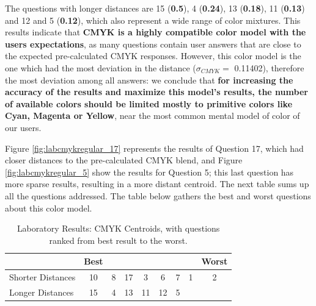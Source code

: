 %
The questions with longer distances are 15 (\textbf{0.5}), 4 (\textbf{0.24}), 13 (\textbf{0.18}), 11 (\textbf{0.13}) and 12 and 5 (\textbf{0.12}), which also represent a wide range of color mixtures. This results indicate that \textbf{CMYK is a highly compatible color model with the users expectations},
as many questions contain user answers that are close to the expected pre-calculated CMYK responses. However, this color model is the one which had the most deviation in the distance ($\sigma_{CMYK} = $ 0.11402), therefore the most deviation among all answers: we conclude that \textbf{for increasing the
accuracy of the results and maximize this model's results, the number of available colors should be limited mostly to primitive colors like Cyan, Magenta or Yellow}, near the most common mental model of color of our users.  \par
%
Figure \ref{fig:labcmykregular_17} represents the results of Question 17, which had closer distances to the pre-calculated CMYK blend, and Figure \ref{fig:labcmykregular_5} show the results for Question 5; this last question has more sparse results, resulting in a more distant
centroid. The next table sums up all the questions addressed. The table below gathers the best and worst questions about this color model. \par
%
\begin{table}[htbp]
  \centering
  \begin{tabular}{@{}lcccccccc@{}}
  \toprule
      & \multicolumn{1}{l}{Best}                        & \multicolumn{1}{l}{}                            & \multicolumn{1}{l}{}                           & \multicolumn{1}{l}{}                            & \multicolumn{1}{l}{}                            & \multicolumn{1}{l}{}                            & \multicolumn{1}{l}{}                            & \multicolumn{1}{l}{Worst}                       \\ \midrule
  \multicolumn{1}{l|}{Shorter Distances} & \multicolumn{1}{c||}{\cellcolor[HTML]{0080FF}10} & \multicolumn{1}{c||}{\cellcolor[HTML]{FF0000}8}  & \multicolumn{1}{c||}{\cellcolor[HTML]{00FF00}17} & \multicolumn{1}{c||}{\cellcolor[HTML]{80FF00}3}  & \multicolumn{1}{c||}{\cellcolor[HTML]{FF8000}6} & \multicolumn{1}{c||}{\cellcolor[HTML]{0000FF}7} & \multicolumn{1}{c||}{\cellcolor[HTML]{FFFF00}1} & \multicolumn{1}{c|}{\cellcolor[HTML]{FF00FF}2} \\ \midrule
  \multicolumn{1}{l|}{Longer Distances}  & \multicolumn{1}{c||}{\cellcolor[HTML]{00FF80}15} & \multicolumn{1}{c||}{\cellcolor[HTML]{7F00FF}4} & \multicolumn{1}{c||}{\cellcolor[HTML]{0080FF}13} & \multicolumn{1}{c||}{\cellcolor[HTML]{FF8000}11} & \multicolumn{1}{c||}{\cellcolor[HTML]{80FF00}12} & \multicolumn{1}{c|}{\cellcolor[HTML]{FF0080}5} & & \\ \bottomrule
  \end{tabular}
  \caption[Laboratory Results: CMYK Centroids]{Laboratory Results: CMYK Centroids, with questions ranked from best result to the worst.}
  \label{table:centroids_cmykresults}
\end{table}
%

